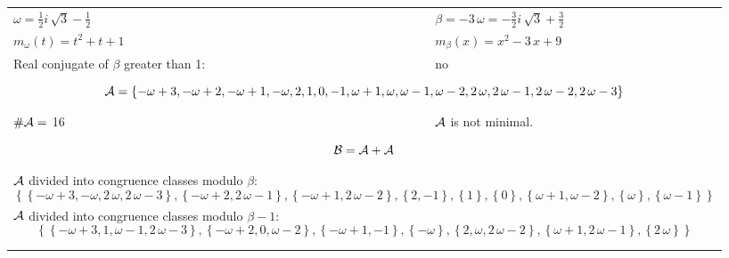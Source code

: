 \begin{exmp}
\label{ex:compareAD}


\rule{0cm}{0cm}

\begin{tabular}{ll}
$\omega=  \frac{1}{2} i \, \sqrt{3} - \frac{1}{2} $  & $\beta= -3 \, \omega = -\frac{3}{2} i \, \sqrt{3} + \frac{3}{2} $\\
$m_\omega(t)=  t^{2} + t + 1 $  & $m_\beta(x)=  x^{2} - 3 \, x + 9 $\\
Real conjugate of $\beta$ greater than 1:   &  no \\ \hline
\multicolumn{2}{l}{\begin{minipage}{\textwidth}\begin{dmath*}\A = \left\{-\omega + 3, -\omega + 2, -\omega + 1, -\omega, 2, 1, 0, -1, \omega + 1, \omega, \omega - 1, \omega - 2, 2 \, \omega, 2 \, \omega - 1, 2 \, \omega - 2, 2 \, \omega - 3\right\}  \end{dmath*}\end{minipage} }\\
$\#\mathcal{A}= $ 16 $ $ & $\mathcal{A}$ is not minimal. \\
\multicolumn{2}{l}{\begin{minipage}{\textwidth}\begin{dmath*}\B =\A+\A \end{dmath*}\end{minipage} }\\[10pt]
\multicolumn{2}{l}{\begin{minipage}{\textwidth}$\mathcal{A}$ divided into congruence classes modulo $\beta$: \begin{dmath*} \left\{\left\{-\omega + 3, -\omega, 2 \, \omega, 2 \, \omega - 3\right\}, \left\{-\omega + 2, 2 \, \omega - 1\right\}, \left\{-\omega + 1, 2 \, \omega - 2\right\}, \left\{2, -1\right\}, \left\{1\right\}, \left\{0\right\}, \left\{\omega + 1, \omega - 2\right\}, \left\{\omega\right\}, \left\{\omega - 1\right\}\right\}  \end{dmath*}\end{minipage} }\\[10pt]
\multicolumn{2}{l}{\begin{minipage}{\textwidth}$\mathcal{A}$ divided into congruence classes modulo $\beta-1$: \begin{dmath*} \left\{\left\{-\omega + 3, 1, \omega - 1, 2 \, \omega - 3\right\}, \left\{-\omega + 2, 0, \omega - 2\right\}, \left\{-\omega + 1, -1\right\}, \left\{-\omega\right\}, \left\{2, \omega, 2 \, \omega - 2\right\}, \left\{\omega + 1, 2 \, \omega - 1\right\}, \left\{2 \, \omega\right\}\right\}  \end{dmath*}\end{minipage} }\\
 & \\ \hline
 & \\
\end{tabular}


\end{exmp}
